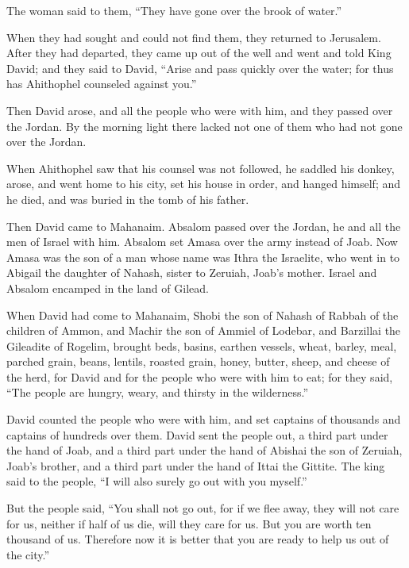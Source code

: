 The woman said to them, “They have gone over the brook of water.”

When they had sought and could not find them, they returned to Jerusalem.
\myverse{}After they had departed, they came up out of the well and went and told King
David; and they said to David, “Arise and pass quickly over the water; for thus has Ahithophel counseled
against you.”

\myverse{}Then David arose, and all the people who were with him, and
they passed over the Jordan. By the morning light there lacked not one of them who had not gone over the
Jordan.

\myverse{}When Ahithophel saw that his counsel was not followed, he saddled
his donkey, arose, and went home to his city, set his house in order, and hanged himself; and he died,
and was buried in the tomb of his father.

\myverse{}Then David came to Mahanaim. Absalom passed over the Jordan,
he and all the men of Israel with him.
\myverse{}Absalom set Amasa over the army instead of Joab. Now Amasa was the son of
a man whose name was Ithra the Israelite, who went in to Abigail the daughter of Nahash, sister to Zeruiah,
Joab’s mother.
\myverse{}Israel and Absalom encamped in the land of Gilead.

\myverse{}When David had come to Mahanaim, Shobi the son of Nahash of
Rabbah of the children of Ammon, and Machir the son of Ammiel of Lodebar, and Barzillai the Gileadite
of Rogelim,
\myverse{}brought beds, basins, earthen vessels, wheat, barley, meal, parched grain,
beans, lentils, roasted grain,
\myverse{}honey, butter, sheep, and cheese of the herd, for David and for the people
who were with him to eat; for they said, “The people are hungry, weary, and thirsty in the wilderness.”


\mychapter{} \myverse*{}David counted the people who were with him, and set captains of
thousands and captains of hundreds over them.
\myverse{}David sent the people out, a third part under the hand of Joab, and a third
part under the hand of Abishai the son of Zeruiah, Joab’s brother, and a third part under the hand of
Ittai the Gittite. The king said to the people, “I will also surely go out with you myself.”

\myverse{}But the people said, “You shall not go out, for if we flee away,
they will not care for us, neither if half of us die, will they care for us. But you are worth ten thousand
of us. Therefore now it is better that you are ready to help us out of the city.”

